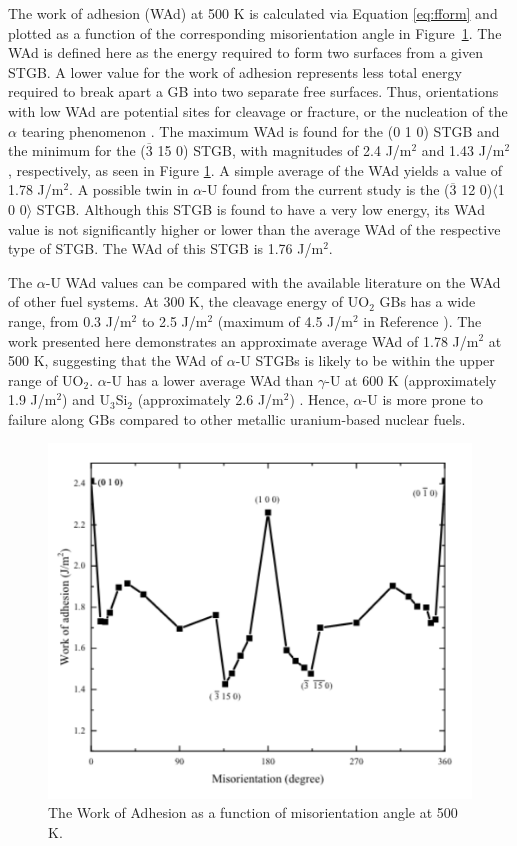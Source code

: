 \documentclass{anstrans}
\begin{document}
The work of adhesion (WAd) at 500 K is calculated via Equation \ref{eq:fform} and plotted as a function of the corresponding misorientation angle in Figure~\ref{fig:3}. The WAd is defined here as the energy required to form two surfaces from a given STGB. A lower value for the work of adhesion represents less total energy required to break apart a GB into two separate free surfaces. Thus, orientations with low WAd are potential sites for cleavage or fracture, or the nucleation of the $\alpha$ tearing phenomenon \cite{rest1993}. The maximum WAd is found for the (0 1 0) STGB and the minimum for the ($\overline{3}$ 15 0) STGB, with magnitudes of 2.4 J/m$^2$ and 1.43 J/m$^2$, respectively, as seen in Figure \ref{fig:3}. A simple average of the WAd yields a value of 1.78 J/m${^2}$. A possible twin in $\alpha$-U found from the current study is the ($\overline{3}$ 12 0)$\langle$1 0 0$\rangle$ STGB. Although this STGB is found to have a very low energy, its WAd value is not significantly higher or lower than the average WAd of the respective type of STGB. The WAd of this STGB is 1.76 J/m$^2$.

The $\alpha$-U WAd values can be compared with the available literature on the WAd of other fuel systems. At 300 K, the cleavage energy of UO$_\mathrm{2}$ \cite{emeric2019} GBs has a wide range, from 0.3 J/m$^2$ to 2.5 J/m$^2$ (maximum of 4.5 J/m$^2$ in Reference \cite{williams2015}). The work presented here demonstrates an approximate average WAd of 1.78 J/m$^2$ at 500 K, suggesting that the WAd of $\alpha$-U STGBs is likely to be within the upper range of UO$_\mathrm{2}$. $\alpha$-U has a lower average WAd than $\gamma$-U at 600 K (approximately 1.9 J/m$^2$) and U$_\mathrm{3}$Si$_\mathrm{2}$ (approximately 2.6 J/m$^2$) \cite{beeler2018,beeler2019}. Hence, $\alpha$-U is more prone to failure along GBs compared to other metallic uranium-based nuclear fuels.

\begin{figure}[ht] %
  \centering
  \includegraphics[width=\columnwidth]{fig3}
  \caption{The Work of Adhesion as a function of misorientation angle at 500 K.}
  \label{fig:3}
\end{figure}
\end{document}
